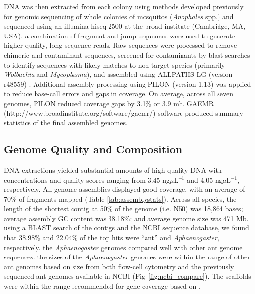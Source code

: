 \documentclass[fleqn,10pt,lineno]{wlpeerj} %
\begin{document}
DNA was then extracted from each colony using methods developed
previously for genomic sequencing of whole colonies of mosquitos
(\textit{Anophales} spp.)  \citep{Neafsey2010} and sequenced using an
illumina hiseq 2500 at the broad institute (Cambridge, MA, USA). a
combination of fragment and jump sequences were used to generate
higher quality, long sequence reads. Raw sequences were processed to
remove chimeric and contaminant sequences, screened for contaminants
by blast searches to identify sequences with likely matches to
non-target species (primarily \textit{Wolbachia} and
\textit{Mycoplasma}), and assembled using ALLPATHS-LG (version r48559)
\citep{Gnerre2011}. Additional assembly processing using PILON
(version 1.13) \citep{Walker2014} was applied to reduce base-call
errors and gaps in coverage. On average, across all seven genomes,
PILON reduced coverage gaps by 3.1\% or 3.9 mb. GAEMR
(http://www.broadinstitute.org/software/gaemr/) software produced
summary statistics of the final assembled genomes.



\subsection*{Genome Quality and Composition}

DNA extractions yielded substantial amounts of high quality DNA with
concentrations and quality scores ranging from 3.45
ng$\mu$L$^{-1}$ and 4.05 ng$\mu$L$^{-1}$,
respectively. All genome assemblies displayed good coverage, with an
average of 70\% of fragments mapped (Table
\ref{tab:assemblystats}). Across all species, the length of the
shortest contig at 50\% of the genome (i.e. N50) was 18,864 bases;
average assembly GC content was 38.18\%; and average genome size was
471 Mb.  using a BLAST search of the contigs and the NCBI sequence
database, we found that 38.98\% and 22.04\% of the top hits were
``ant'' and \textit{Aphaenogaster}, respectively. the
\textit{Aphaenogaster} genomes compared well with other ant genome
sequences. the sizes of the \textit{Aphaenogaster} genomes were within
the range of other ant genomes based on size from both flow-cell
cytometry \citep{Tsutsui2008a} and the previously sequenced ant
genomes available in NCBI (Fig~\ref{fig:ncbi_compare}). The scaffolds
were within the range recommended for gene coverage based on
\citet{Efron2007}.



\end{document}
